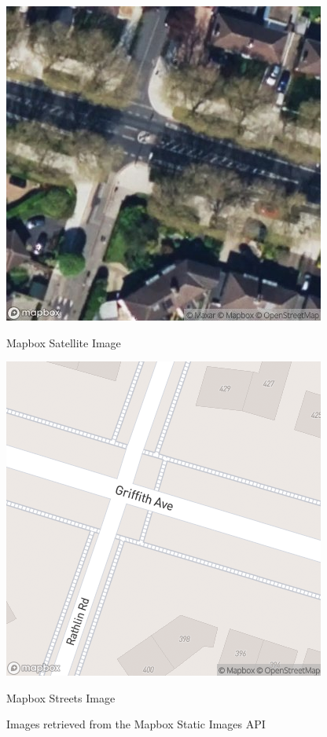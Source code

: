 \begin{figure}[htbp]
    \centering
    \begin{minipage}{0.45\textwidth}
        \centering
        \includegraphics[width=\textwidth]{images/satellite_img.png}
        \caption*{Mapbox Satellite Image}
    \end{minipage}
    \hfill
    \begin{minipage}{0.45\textwidth}
        \centering
        \includegraphics[width=\textwidth]{images/streets_img.png}
        \caption*{Mapbox Streets Image}
    \end{minipage}
    \caption{Images retrieved from the Mapbox Static Images API}
    \label{fig:Mapbox_images}
\end{figure}

